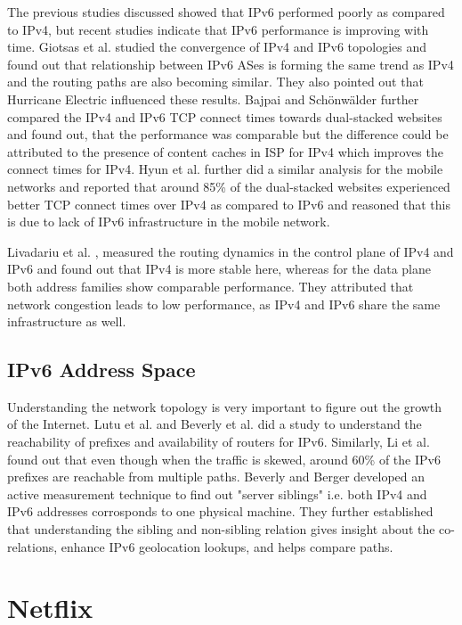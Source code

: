 The previous studies discussed showed that IPv6 performed poorly as compared to IPv4, but recent studies indicate that IPv6 performance is improving with time. 
Giotsas et al. \cite{46giotsas} studied the convergence of IPv4 and IPv6 topologies and found out that relationship between IPv6 ASes is forming the same trend as IPv4 and the routing paths are also becoming similar. They also pointed out that Hurricane Electric influenced these results. Bajpai and Schönwälder \cite{46bajpai} further compared the IPv4 and IPv6 TCP connect times towards dual-stacked websites and found out,
that the performance was comparable but the difference could be attributed to the presence of content caches in ISP for IPv4 which improves the connect times for IPv4. Hyun et al. \cite{46hyun} further did a similar analysis
for the mobile networks and reported that around 85\% of the dual-stacked websites experienced better TCP connect times over IPv4 as compared to IPv6 and reasoned that this is due to lack of IPv6
infrastructure in the mobile network.

Livadariu et al. \cite{46liva}, measured the routing dynamics in the control plane of IPv4 and IPv6 and found out that IPv4 is more stable here, whereas for the data plane both address
families show comparable performance. They attributed that network congestion leads to low performance, as IPv4 and IPv6 share the same infrastructure as well.

\subsection*{IPv6 Address Space}
Understanding the network topology is very important to figure out the growth of the Internet. Lutu et al. \cite{addresslutu} and Beverly et al. \cite{addressbeverly} did a study to
understand the reachability of prefixes and availability of routers for IPv6. Similarly, Li et al. \cite{addressli} found out that even though when the traffic is skewed, around 60\% of the IPv6 prefixes are reachable from multiple paths. Beverly and Berger \cite{beverly2} developed an active measurement technique to find out "server siblings" i.e. both IPv4 and IPv6 addresses corrosponds to one physical machine. They further established that understanding the sibling and non-sibling relation gives insight about the co-relations, enhance IPv6 geolocation lookups, and helps compare paths.

\section*{Netflix}


